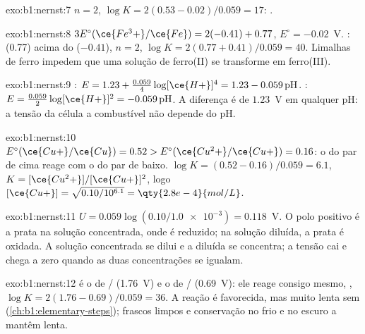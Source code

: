 \begin{solution}{exo:b1:nernst:7}
$n = 2$, $\log K = 2(0.53 - 0.02)/0.059 = 17$: .
\end{solution}

\begin{solution}{exo:b1:nernst:8}
$3E^\circ(\ce{Fe^3+}/\ce{Fe}) = 2(-0.41) + 0.77$, $E^\circ = -0.02$~V.
:   (0.77) acima do 
 ($-0.41$), $n = 2$, $\log K = 2(0.77 + 0.41)/0.059 = 40$.
Limalhas de ferro impedem que uma solução de ferro(II) se transforme em
ferro(III).
\end{solution}

\begin{solution}{exo:b1:nernst:9}
: $E = 1.23 + \frac{0.059}{4}\log [\ce{H+}]^4 =
1.23 - 0.059\,\mathrm{pH}$. : $E = \frac{0.059}{2}\log
[\ce{H+}]^2 = -0.059\,\mathrm{pH}$. A diferença é de $1.23$~V em qualquer
pH: a tensão da célula a combustível não depende do pH.
\end{solution}

\begin{solution}{exo:b1:nernst:10}
$E^\circ(\ce{Cu+}/\ce{Cu}) = 0.52 > E^\circ(\ce{Cu^2+}/\ce{Cu+}) = 0.16$: o
  do par de cima reage com o   do par de
baixo. $\log K = (0.52 - 0.16)/0.059 = 6.1$, $K =
[\ce{Cu^2+}]/[\ce{Cu+}]^2$, logo $[\ce{Cu+}] = \sqrt{0.10/10^{6.1}} =
\qty{2.8e-4}{mol/L}$.
\end{solution}

\begin{solution}{exo:b1:nernst:11}
$U = 0.059\log(0.10/\num{1.0e-3}) = 0.118$~V. O polo positivo é a prata
na solução concentrada, onde  é reduzido; na solução diluída, a
prata é oxidada. A solução concentrada se dilui e a diluída se
concentra; a tensão cai e chega a zero quando as duas concentrações se
igualam.
\end{solution}

\begin{solution}{exo:b1:nernst:12}
 é o  de / (1.76~V) e o  de
/ (0.69~V): ele reage consigo mesmo, ,
$\log K = 2(1.76 - 0.69)/0.059 = 36$. A reação é favorecida, mas muito
lenta sem  (\cref{ch:b1:elementary-steps}); frascos limpos e
conservação no frio e no escuro a mantêm lenta.
\end{solution}

